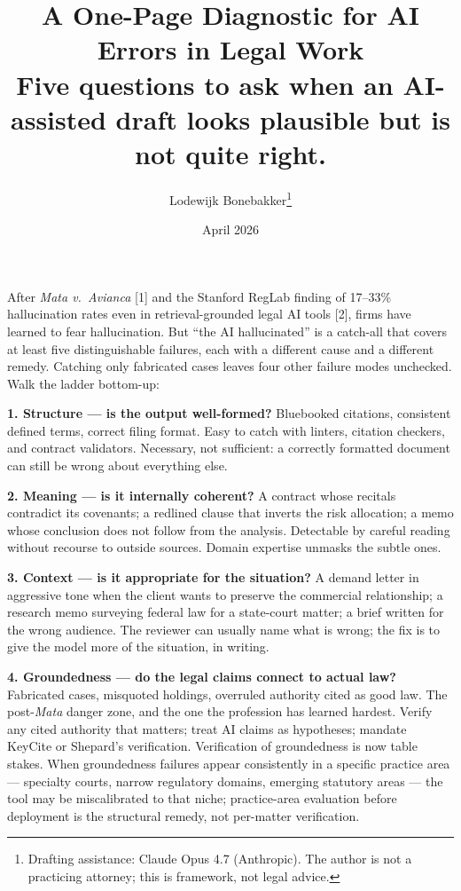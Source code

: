 \documentclass[11pt,a4paper]{article}
\title{A One-Page Diagnostic for AI Errors in Legal Work\\[0.2em]
\large Five questions to ask when an AI-assisted draft looks
plausible but is not quite right.}
\author{\small Lodewijk Bonebakker\thanks{Drafting assistance:
Claude Opus 4.7 (Anthropic). The author is not a practicing
attorney; this is framework, not legal advice.}}
\date{\small April 2026}
\begin{document}
\maketitle
\vspace{-1.5em}

\noindent
After \emph{Mata v.~Avianca} [1] and the Stanford RegLab finding
of 17--33\% hallucination rates even in retrieval-grounded legal
AI tools [2], firms have learned to fear hallucination. But ``the
AI hallucinated'' is a catch-all that covers at least five
distinguishable failures, each with a different cause and a
different remedy. Catching only fabricated cases leaves four other
failure modes unchecked. Walk the ladder bottom-up:

\textbf{1. Structure --- is the output well-formed?}
Bluebooked citations, consistent defined terms, correct filing
format. Easy to catch with linters, citation checkers, and
contract validators. Necessary, not sufficient: a correctly
formatted document can still be wrong about everything else.

\textbf{2. Meaning --- is it internally coherent?}
A contract whose recitals contradict its covenants; a redlined
clause that inverts the risk allocation; a memo whose conclusion
does not follow from the analysis. Detectable by careful reading
without recourse to outside sources. Domain expertise unmasks the
subtle ones.

\textbf{3. Context --- is it appropriate for the situation?}
A demand letter in aggressive tone when the client wants to
preserve the commercial relationship; a research memo surveying
federal law for a state-court matter; a brief written for the
wrong audience. The reviewer can usually name what is wrong; the
fix is to give the model more of the situation, in writing.

\textbf{4. Groundedness --- do the legal claims connect to actual
law?} Fabricated cases, misquoted holdings, overruled authority
cited as good law. The post-\emph{Mata} danger zone, and the one
the profession has learned hardest. Verify any cited authority
that matters; treat AI claims as hypotheses; mandate KeyCite or
Shepard's verification. Verification of groundedness is now table
stakes. When groundedness failures appear consistently in a
specific practice area --- specialty courts, narrow regulatory
domains, emerging statutory areas --- the tool may be
miscalibrated to that niche; practice-area evaluation before
deployment is the structural remedy, not per-matter
verification.
\end{document}
